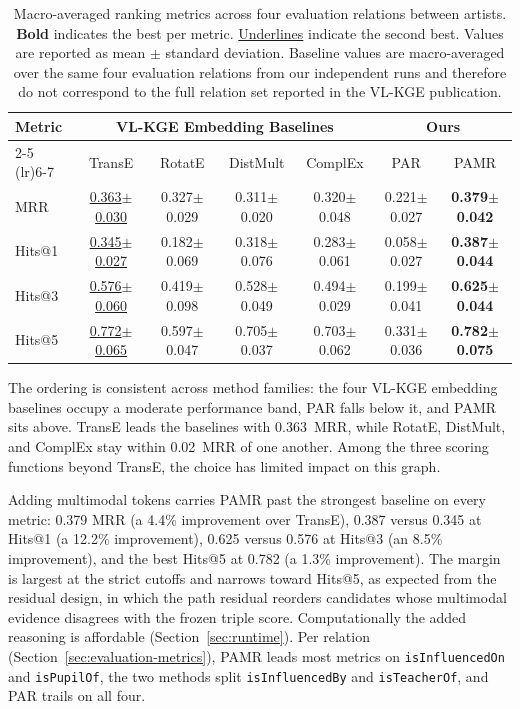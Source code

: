 \documentclass[runningheads]{llncs}
\begin{document}
\begin{table}[t]
  \centering
  \setlength{\tabcolsep}{2pt}
  \renewcommand{\arraystretch}{1.15}
  {\footnotesize
    \begin{tabular}{l|cccc|cc}
      \toprule
      \multirow{2}{*}{Metric} &
      \multicolumn{4}{|c|}{VL-KGE Embedding Baselines} &
      \multicolumn{2}{|c|}{Ours} \\
      \cmidrule(lr){2-5} \cmidrule(lr){6-7}
      & TransE & RotatE & DistMult & ComplEx & PAR & PAMR \\
      \midrule
      MRR  & \underline{0.363$\pm$0.030} & 0.327$\pm$0.029 & 0.311$\pm$0.020 & 0.320$\pm$0.048 & 0.221$\pm$0.027 & \textbf{0.379$\pm$0.042} \\
      Hits@1 & \underline{0.345$\pm$0.027} & 0.182$\pm$0.069 & 0.318$\pm$0.076 & 0.283$\pm$0.061 & 0.058$\pm$0.027 & \textbf{0.387$\pm$0.044} \\
      Hits@3 & \underline{0.576$\pm$0.060} & 0.419$\pm$0.098 & 0.528$\pm$0.049 & 0.494$\pm$0.029 & 0.199$\pm$0.041 & \textbf{0.625$\pm$0.044} \\
      Hits@5 & \underline{0.772$\pm$0.065} & 0.597$\pm$0.047 & 0.705$\pm$0.037 & 0.703$\pm$0.062 & 0.331$\pm$0.036 & \textbf{0.782$\pm$0.075} \\
      \bottomrule
  \end{tabular}}
  \caption{Macro-averaged ranking metrics across four evaluation
    relations between artists. \textbf{Bold} indicates the best per metric.
    \underline{Underlines} indicate the second best. Values are reported
    as mean $\pm$ standard deviation. Baseline values are macro-averaged
    over the same four evaluation relations from our independent runs
    and therefore do not correspond to the full relation set reported in
    the VL-KGE publication.}
  \label{tab:results}
\end{table}

The ordering is consistent across method families: the four VL-KGE
embedding baselines occupy a moderate performance band, PAR falls
below it, and PAMR sits above. TransE leads the baselines with
0.363~MRR, while RotatE, DistMult, and ComplEx stay within
0.02~MRR of one another. Among the three scoring functions beyond
TransE, the choice has limited impact on this graph.

Adding multimodal tokens carries PAMR past the strongest baseline on
every metric: 0.379 MRR (a 4.4\% improvement over TransE), 0.387
versus 0.345 at Hits@1 (a 12.2\% improvement), 0.625 versus 0.576 at
Hits@3 (an 8.5\% improvement), and the best Hits@5 at 0.782 (a 1.3\%
improvement). The margin is largest at the strict cutoffs and narrows
toward Hits@5, as expected from the residual design, in which the path
residual reorders candidates whose multimodal evidence disagrees with the
frozen triple score. Computationally the added reasoning is affordable
(Section~\ref{sec:runtime}). Per relation
(Section~\ref{sec:evaluation-metrics}), PAMR leads most metrics on
\texttt{isInfluencedOn} and \texttt{isPupilOf}, the two methods split
\texttt{isInfluencedBy} and \texttt{isTeacherOf}, and PAR trails on
all four.
\end{document}
